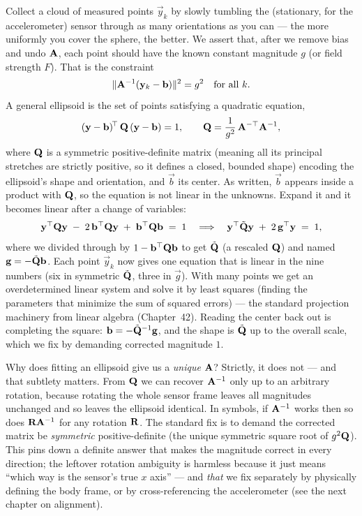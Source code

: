 Collect a cloud of measured points
$\vec{y}_k$ by slowly tumbling the (stationary, for the accelerometer)
sensor through as many orientations as you can --- the more uniformly you cover
the sphere, the better. We assert that, after we remove bias and undo $\mathbf{A}$,
each point should have the known constant magnitude $g$ (or field strength $F$).
That is the constraint
\begin{equation}
  \lVert\mathbf{A}^{-1}(\mathbf{y}_k - \mathbf{b})\rVert^2 = g^2 \quad\text{for all } k.
  \label{ch35:constraint}
\end{equation}
A general ellipsoid is the set of points satisfying a quadratic equation,
\begin{equation}
  (\mathbf{y}-\mathbf{b})^{\!\top}\,\mathbf{Q}\,(\mathbf{y}-\mathbf{b}) = 1,
  \qquad \mathbf{Q} = \frac{1}{g^2}\,\mathbf{A}^{-\top}\mathbf{A}^{-1},
  \label{ch35:ellipsoid-eq}
\end{equation}
where $\mathbf{Q}$ is a symmetric positive-definite matrix (meaning all its principal stretches are strictly positive, so it defines a closed, bounded shape) encoding the ellipsoid's
shape and orientation, and $\vec{b}$ its center. As written, $\vec{b}$ appears
inside a product with $\mathbf{Q}$, so the equation is not linear in the unknowns. Expand it
and it becomes linear after a change of variables:
\[
  \mathbf{y}^{\top}\mathbf{Q}\mathbf{y} \;-\; 2\,\mathbf{b}^{\top}\mathbf{Q}\mathbf{y}
  \;+\; \mathbf{b}^{\top}\mathbf{Q}\mathbf{b} \;=\; 1
  \quad\Longrightarrow\quad
  \mathbf{y}^{\top}\tilde{\mathbf{Q}}\mathbf{y} \;+\; 2\,\mathbf{g}^{\top}\mathbf{y} \;=\; 1,
\]
where we divided through by $1-\mathbf{b}^{\top}\mathbf{Q}\mathbf{b}$ to get
$\tilde{\mathbf{Q}}$ (a rescaled $\mathbf{Q}$) and named $\mathbf{g} = -\tilde{\mathbf{Q}}\mathbf{b}$.
Each point $\vec{y}_k$ now gives one equation that is linear in the nine numbers
(six in symmetric $\tilde{\mathbf{Q}}$, three in $\vec{g}$). With many points we get an
overdetermined linear system and solve it by least squares (finding the parameters that minimize the sum of squared errors) --- the standard projection
machinery from linear algebra (Chapter~42). Reading the center back out is completing
the square: $\mathbf{b} = -\tilde{\mathbf{Q}}^{-1}\mathbf{g}$, and the shape is $\tilde{\mathbf{Q}}$
up to the overall scale, which we fix by demanding corrected magnitude $1$.

\begin{whybox}
Why does fitting an ellipsoid give us a \emph{unique} $\mathbf{A}$? Strictly, it does
not --- and that subtlety matters. From $\mathbf{Q}$ we can recover $\mathbf{A}^{-1}$
only up to an arbitrary rotation, because rotating the whole sensor frame leaves
all magnitudes unchanged and so leaves the ellipsoid identical. In symbols, if
$\mathbf{A}^{-1}$ works then so does $\mathbf{R}\mathbf{A}^{-1}$ for any rotation $\mathbf{R}$.
The standard fix is to demand the corrected matrix be \emph{symmetric}
positive-definite (the unique symmetric square root of $g^2\mathbf{Q}$). This pins
down a definite answer that makes the magnitude correct in every direction; the
leftover rotation ambiguity is harmless because it just means ``which way is the
sensor's true $x$ axis'' --- and \emph{that} we fix separately by physically
defining the body frame, or by cross-referencing the accelerometer (see the next
chapter on alignment).
\end{whybox}

